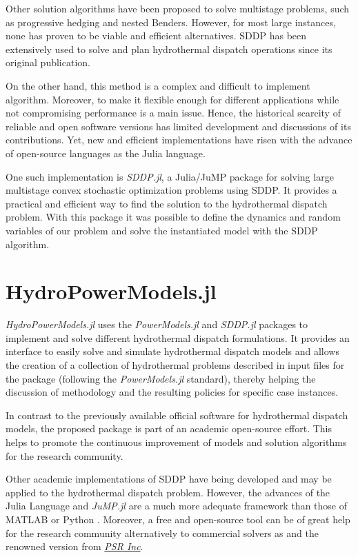 \documentclass{juliacon}
\begin{document}
Other solution algorithms have been proposed to solve multistage problems, such as progressive hedging and nested Benders. However, for most large instances, none has proven to be viable and efficient alternatives. SDDP has been extensively used to solve and plan hydrothermal dispatch operations since its original publication.  

On the other hand, this method is a complex and difficult to implement algorithm. Moreover, to make it flexible enough for different applications while not compromising performance is a main issue. Hence, the historical scarcity of reliable and open software versions has limited development and discussions of its contributions. Yet, new and efficient implementations have risen with the advance of open-source languages as the Julia language.  

One such implementation is \textit{SDDP.jl}, a Julia/JuMP package for solving large multistage convex stochastic optimization problems using SDDP. It provides a practical and efficient way to find the solution to the hydrothermal dispatch problem. With this package it was possible to define the dynamics and random variables of our problem and solve the instantiated model with the SDDP algorithm.

\section{HydroPowerModels.jl}
\label{sec:hydropowermodels}

\textit{HydroPowerModels.jl} uses the \textit{PowerModels.jl} and \textit{SDDP.jl} packages to implement and solve different hydrothermal dispatch formulations. It provides an interface to easily solve and simulate hydrothermal dispatch models and allows the creation of a collection of hydrothermal problems described in input files for the package (following the \textit{PowerModels.jl} standard), thereby helping the discussion of methodology and the resulting policies for specific case instances. 

In contrast to the previously available official software for hydrothermal dispatch models, the proposed package is part of an academic open-source effort. This helps to promote the continuous improvement of models and solution algorithms for the research community.

Other academic implementations of SDDP have being developed and may be applied to the hydrothermal dispatch problem. However, the advances of the Julia Language and \textit{JuMP.jl} are a much more adequate framework than those of MATLAB \cite{FATS} or Python \cite{raso2016optimist,Lingquan2019}.  Moreover, a free and open-source tool can be of great help for the research community alternatively to commercial solvers as \cite{lohndorf2018quasar} and the renowned version from \href{https://www.psr-inc.com/softwares-en/}{\textit{PSR Inc}}.
\end{document}
